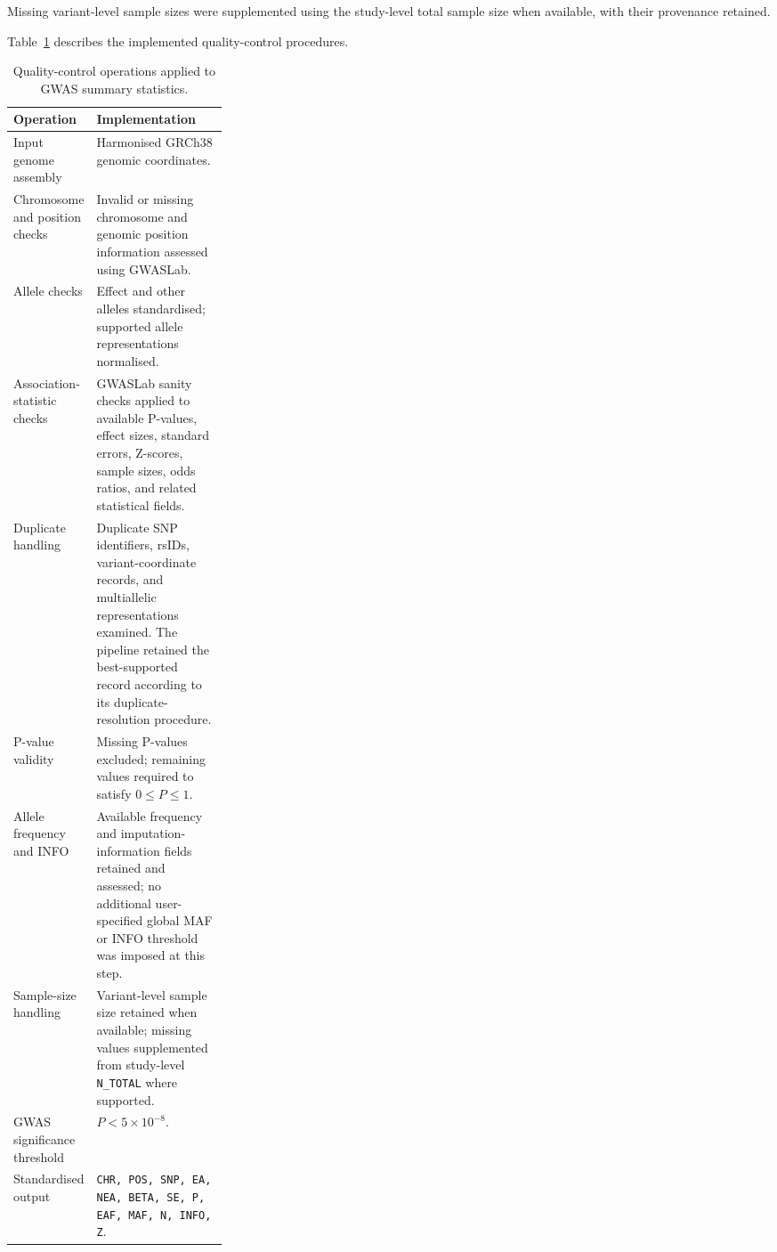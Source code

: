 \documentclass[11pt,a4paper]{article}
\begin{document}
Missing variant-level sample sizes were supplemented
using the study-level total sample size when available,
with their provenance retained.

Table~\ref{tab:gwas_qc_parameters} describes the
implemented quality-control procedures.

\begin{table}[htbp]
\centering
\small
\caption{Quality-control operations applied to GWAS
summary statistics.}
\label{tab:gwas_qc_parameters}

\begin{tabularx}{\linewidth}{@{}p{0.28\linewidth}X@{}}
\toprule
\textbf{Operation} & \textbf{Implementation} \\
\midrule

Input genome assembly &
Harmonised GRCh38 genomic coordinates. \\

Chromosome and position checks &
Invalid or missing chromosome and genomic position
information assessed using GWASLab. \\

Allele checks &
Effect and other alleles standardised; supported
allele representations normalised. \\

Association-statistic checks &
GWASLab sanity checks applied to available P-values,
effect sizes, standard errors, Z-scores, sample sizes,
odds ratios, and related statistical fields. \\

Duplicate handling &
Duplicate SNP identifiers, rsIDs, variant-coordinate
records, and multiallelic representations examined.
The pipeline retained the best-supported record
according to its duplicate-resolution procedure. \\

P-value validity &
Missing P-values excluded; remaining values required
to satisfy $0 \leq P \leq 1$. \\

Allele frequency and INFO &
Available frequency and imputation-information fields
retained and assessed; no additional user-specified
global MAF or INFO threshold was imposed at this step. \\

Sample-size handling &
Variant-level sample size retained when available;
missing values supplemented from study-level
\texttt{N\_TOTAL} where supported. \\

GWAS significance threshold &
$P < 5 \times 10^{-8}$. \\

Standardised output &
\texttt{CHR, POS, SNP, EA, NEA, BETA, SE, P, EAF,
MAF, N, INFO, Z}. \\

\bottomrule
\end{tabularx}
\end{table}
\end{document}

